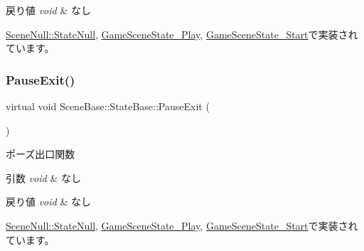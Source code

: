 \begin{DoxyRetVals}{戻り値}
{\em void} & なし \\
\hline
\end{DoxyRetVals}


\mbox{\hyperlink{class_scene_null_1_1_state_null_a0a14205bef6c8f73c3ef6b785b104f02}{Scene\+Null\+::\+State\+Null}}, \mbox{\hyperlink{class_game_scene_state___play_a3bd935dc9cf71fc77d35a1e9001b0d94}{Game\+Scene\+State\+\_\+\+Play}}, \mbox{\hyperlink{class_game_scene_state___start_a7f1b9f52bfb791622ca589ebd970dade}{Game\+Scene\+State\+\_\+\+Start}}で実装されています。

\mbox{\label{class_scene_base_1_1_state_base_aba22c2bc7244d4ffcd6f159c28be2dcf}} 
\subsubsection{\texorpdfstring{Pause\+Exit()}{PauseExit()}}
{\footnotesize\ttfamily virtual void Scene\+Base\+::\+State\+Base\+::\+Pause\+Exit (\begin{DoxyParamCaption}{ }\end{DoxyParamCaption})\hspace{0.3cm}{\ttfamily [pure virtual]}}



ポーズ出口関数 


\begin{DoxyParams}{引数}
{\em void} & なし \\
\hline
\end{DoxyParams}

\begin{DoxyRetVals}{戻り値}
{\em void} & なし \\
\hline
\end{DoxyRetVals}


\mbox{\hyperlink{class_scene_null_1_1_state_null_acf2eecc6ee9f16b57095aa0b88192257}{Scene\+Null\+::\+State\+Null}}, \mbox{\hyperlink{class_game_scene_state___play_ae564bcc1a570009c144722f252cb73ff}{Game\+Scene\+State\+\_\+\+Play}}, \mbox{\hyperlink{class_game_scene_state___start_a667dd2400867b901ca8f2ce3a4f7d367}{Game\+Scene\+State\+\_\+\+Start}}で実装されています。

\mbox{\label{class_scene_base_1_1_state_base_a924e400bdb8be957b92ee2ac3177534d}} 

